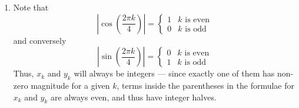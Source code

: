 \documentclass[12 pt, letterpaper]{hmcpset}
\begin{document}
\begin{solution}
	\begin{enumerate}
		\item Note that
			\[
				\left \lvert \cos{\left ( \frac{2 \pi k}{4} \right )} \right \rvert = \begin{cases}
					1 & k \text{ is even} \\
					0 & k \text{ is odd}
				\end{cases}
			\]
			and conversely
			\[
				\left \lvert \sin{\left ( \frac{2 \pi k}{4} \right )} \right \rvert = \begin{cases}
					0 & k \text{ is even} \\
					1 & k \text{ is odd}
				\end{cases}
			\]
			Thus, $x_{k}$ and $y_{k}$ will always be integers --- since exactly one of them has non-zero magnitude for a given $k$, terms inside the parentheses in the formulae for $x_{k}$ and $y_{k}$ are always even, and thus have integer halves.


\end{enumerate}
\end{solution}
\end{document}
